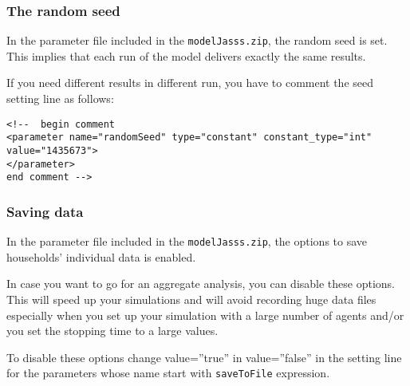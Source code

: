 \documentclass{article}
\begin{document}
\subsubsection*{The random seed}
In the parameter file included in the \verb+modelJasss.zip+, the random seed is set.
This implies that each run of the model delivers exactly the same results.

 
If you need different results in different run, you have to comment the seed setting line as follows:

\color{magenta}
\begin{verbatim}
<!--  begin comment
<parameter name="randomSeed" type="constant" constant_type="int" value="1435673">
</parameter>
end comment -->
\end{verbatim}
\color{black}

\subsubsection*{Saving data}
In the parameter file included in the \verb+modelJasss.zip+, the options to save households' individual data is enabled.

In case you want to go for an aggregate analysis, you can disable these options.
This will speed up your simulations and will avoid recording huge data files especially when you set up your simulation with a large number of agents and/or you set the stopping time to a large values. 

To disable these options change \color{magenta}value=''true'' \color{black} in \color{magenta}value=''false'' \color{black} in the setting line for the parameters whose name start with \verb+saveToFile+ expression.
\end{document}
